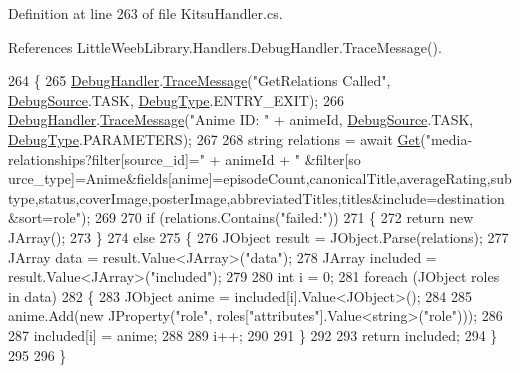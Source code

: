 Definition at line 263 of file Kitsu\+Handler.\+cs.



References Little\+Weeb\+Library.\+Handlers.\+Debug\+Handler.\+Trace\+Message().


\begin{DoxyCode}
264         \{
265             \mbox{\hyperlink{class_little_weeb_library_1_1_handlers_1_1_kitsu_handler_a6d3c55fa5eee15320845c2d902c96882}{DebugHandler}}.\mbox{\hyperlink{interface_little_weeb_library_1_1_handlers_1_1_i_debug_handler_a2e405bc3492e683cd3702fae125221bc}{TraceMessage}}(\textcolor{stringliteral}{"GetRelations Called"}, 
      \mbox{\hyperlink{namespace_little_weeb_library_1_1_handlers_a2a6ca0775121c9c503d58aa254d292be}{DebugSource}}.TASK, \mbox{\hyperlink{namespace_little_weeb_library_1_1_handlers_ab66019ed40462876ec4e61bb3ccb0a62}{DebugType}}.ENTRY\_EXIT);
266             \mbox{\hyperlink{class_little_weeb_library_1_1_handlers_1_1_kitsu_handler_a6d3c55fa5eee15320845c2d902c96882}{DebugHandler}}.\mbox{\hyperlink{interface_little_weeb_library_1_1_handlers_1_1_i_debug_handler_a2e405bc3492e683cd3702fae125221bc}{TraceMessage}}(\textcolor{stringliteral}{"Anime ID: "} + animeId, 
      \mbox{\hyperlink{namespace_little_weeb_library_1_1_handlers_a2a6ca0775121c9c503d58aa254d292be}{DebugSource}}.TASK, \mbox{\hyperlink{namespace_little_weeb_library_1_1_handlers_ab66019ed40462876ec4e61bb3ccb0a62}{DebugType}}.PARAMETERS);
267             
268             \textcolor{keywordtype}{string} relations = await \mbox{\hyperlink{class_little_weeb_library_1_1_handlers_1_1_kitsu_handler_a8b7c629a03096c3152252f6b5cf2937f}{Get}}(\textcolor{stringliteral}{"media-relationships?filter[source\_id]="} + animeId + \textcolor{stringliteral}{"
      &filter[so
      urce\_type]=Anime&fields[anime]=episodeCount,canonicalTitle,averageRating,subtype,status,coverImage,posterImage,abbreviatedTitles,titles&include=destination&sort=role"});
269 
270             \textcolor{keywordflow}{if} (relations.Contains(\textcolor{stringliteral}{"failed:"}))
271             \{
272                 \textcolor{keywordflow}{return} \textcolor{keyword}{new} JArray();
273             \}
274             \textcolor{keywordflow}{else}
275             \{
276                 JObject result = JObject.Parse(relations);
277                 JArray data = result.Value<JArray>(\textcolor{stringliteral}{"data"});
278                 JArray included = result.Value<JArray>(\textcolor{stringliteral}{"included"});
279 
280                 \textcolor{keywordtype}{int} i = 0;
281                 \textcolor{keywordflow}{foreach} (JObject roles \textcolor{keywordflow}{in} data)
282                 \{
283                     JObject anime = included[i].Value<JObject>();
284 
285                     anime.Add(\textcolor{keyword}{new} JProperty(\textcolor{stringliteral}{"role"}, roles[\textcolor{stringliteral}{"attributes"}].Value<string>(\textcolor{stringliteral}{"role"})));
286 
287                     included[i] = anime;
288 
289                     i++;
290 
291                 \}
292 
293                 \textcolor{keywordflow}{return} included;
294             \}
295 
296         \}
\end{DoxyCode}
